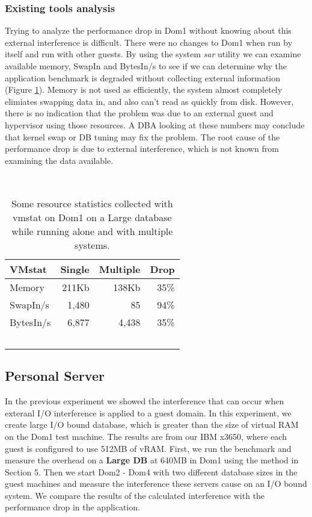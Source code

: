 \subsubsection{Existing tools analysis}
\indent Trying to analyze the performance drop in Dom1 without knowing about this external interference is difficult.  
There were no changes to Dom1 when run by itself and run with other guests.  
By using the system \emph{sar} utility we can examine available memory, SwapIn and BytesIn/s to see if we can determine why the application benchmark is degraded without collecting external information (Figure \ref{fig:vmstat}).  
Memory is not used as efficiently, the system almost completely elimiates swapping data in, and also can't read as quickly from disk.  
However, there is no indication that the problem was due to an external guest and hypervisor using those resources.
A DBA looking at these numbers may conclude that kernel swap or DB tuning may fix the problem.  
The root cause of the performance drop is due to external interference, which is not known from examining the data available.

\begin{table}[h]
  \begin{tabular}{ l | r | r | r }
    VMstat & Single & Multiple & Drop \\ \hline
	Memory & 211Kb & 138Kb & 35\% \\
	SwapIn/s & 1,480 & 85 & 94\% \\
	BytesIn/s & 6,877 & 4,438 & 35\% \\
  \end{tabular}
\caption{Some resource statistics collected with vmstat on Dom1 on a Large database while running alone and with multiple systems.} 
\label{fig:vmstat}
\end{table}

\subsection{Personal Server}
In the previous experiment we showed the interference that can occur when exteranl I/O interference is applied to a guest domain.
In this experiment, we create large I/O bound database, which is greater than the size of virtual RAM on the Dom1 test machine.  
The results are from our IBM x3650, where each guest is configured to use 512MB of vRAM.
First, we run the benchmark and measure the overhead on a \textbf{Large DB} at 640MB in Dom1 using the method in Section 5.  
Then we start Dom2 - Dom4 with two different database sizes in the guest machines and measure the interference these servers cause on an I/O bound system.  We compare the results of the calculated interference with the performance drop in the application.

